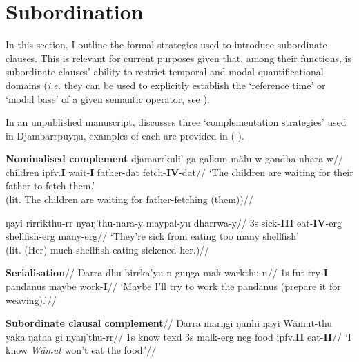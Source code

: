 \section{Subordination}\label{djr-subord}

In this section, I outline the formal strategies used to introduce subordinate clauses. This is relevant for current purposes given that, among their functions, is subordinate clauses' ability to restrict temporal and modal quantificational domains (\textit{i.e.} they can be used to explicitly establish the `reference time' or `modal base' of a given semantic operator, see \citealp{Roberts1995}).

In an unpublished manuscript, \citet{Wilkinson-ms} discusses three `complementation strategies' used in Djambarrpuyŋu, examples of each are provided in (-). 

\pex{}\textbf{Nominalised complement}\a\begingl
\gla djamarrkuḻi' ga galkun mälu-w gondha-nhara-w//
\glb children \gls{ipfv}.\textbf{I} wait-\textbf{I} father-\gls{dat} fetch-\textbf{IV}-\gls{dat}//
\glft`The children are waiting for their father to fetch them.'\\(lit. The children are waiting for father-fetching (them))//\endgl

\a\begingl\gla ŋayi rirrikthu-rr nyaŋ'thu-nara-y maypal-yu dharrwa-y//
\glb 3s sick-\textbf{III} eat-\textbf{IV}-\gls{erg} shellfish-\gls{erg} many-\gls{erg}//
\glft`They're sick from eating too many shellfish'\\(lit. (Her) much-shellfish-eating sickened her.)//\endgl
\xe


\pex{}\begingl\glpreamble\textbf{Serialisation}//
\gla Ŋarra dhu birrka'yu-n guŋga mak warkthu-n//
\glb 1s \gls{fut} try-\textbf{I} pandanus maybe work-\textbf{I}//
\glft`Maybe I'll try to work the pandanus (prepare it for weaving).'//\endgl\xe

\pex{}\begingl\glpreamble\textbf{Subordinate clausal complement}//
\gla Ŋarra marŋgi ŋunhi ŋayi Wämut-thu yaka ŋatha gi nyaŋ'thu-rr//
\glb 1s know \gls{texd} 3s \gls{malk}-\gls{erg} \gls{neg} food \gls{ipfv}.\textbf{II} eat-\textbf{II}//
\glft`I know \textit{Wämut} won't eat the food.'//\endgl
\xe

